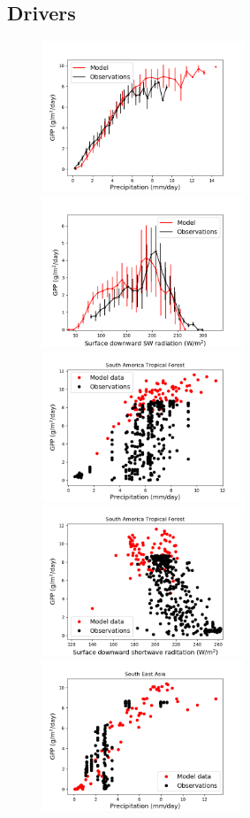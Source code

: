 




\subsection{Drivers}
\begin{figure}[t]
    \includegraphics[width=6cm]{figs/GPPresponse/tl.png}
    \includegraphics[width=6cm]{figs/GPPresponse/tr.png}
    \includegraphics[width=6cm]{figs/GPPresponse/ml.png}
    \includegraphics[width=6cm]{figs/GPPresponse/mr.png}
    \includegraphics[width=6cm]{figs/GPPresponse/bl.png}

\end{figure}
